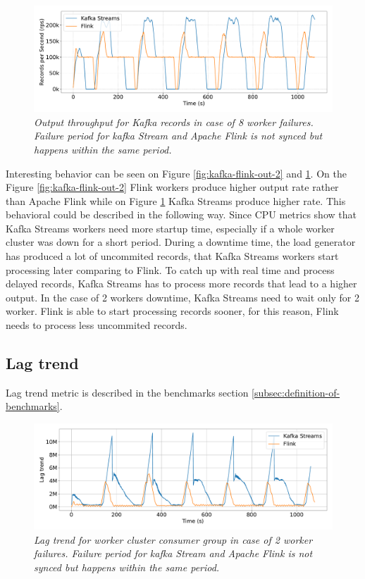 \begin{figure}[H]
    \centering
    \includegraphics[width=1\textwidth]{figures/kafka-flink/output-throught-8pods-kafka-flink}
    \caption{\textit{Output throughput for Kafka records in case of 8 worker failures.
    Failure period for kafka Stream and Apache Flink is not synced but happens within the same period.}}
    \label{fig:kafka-flink-out-8}
\end{figure}

Interesting behavior can be seen on Figure \ref{fig:kafka-flink-out-2} and \ref{fig:kafka-flink-out-8}.
On the Figure \ref{fig:kafka-flink-out-2} Flink workers produce higher output rate
rather than Apache Flink while on Figure \ref{fig:kafka-flink-out-8} Kafka Streams produce
higher rate.
This behavioral could be described in the following way.
Since CPU metrics show that Kafka Streams workers need more startup time, especially
if a whole worker cluster was down for a short period.
During a downtime time, the load generator has produced a lot of uncommited records,
that Kafka Streams workers start processing later comparing to Flink.
To catch up with real time and process delayed records, Kafka Streams has to process
more records that lead to a higher output.
In the case of 2 workers downtime, Kafka Streams need to wait only for 2 worker.
Flink is able to start processing records sooner, for this reason, Flink needs to
process less uncommited records.

\newpage
\subsection{Lag trend}\label{subsec:lag-trend}
Lag trend metric is described in the benchmarks section \ref{subsec:definition-of-benchmarks}.

\begin{figure}[H]
    \centering
    \includegraphics[width=1\textwidth]{figures/kafka-flink/lag-trend-2pod-kafka-flink}
    \caption{\textit{Lag trend for worker cluster consumer group in case of 2 worker failures.
    Failure period for kafka Stream and Apache Flink is not synced but happens within the same period.}}
    \label{fig:kafka-flink-lag-2}
\end{figure}


